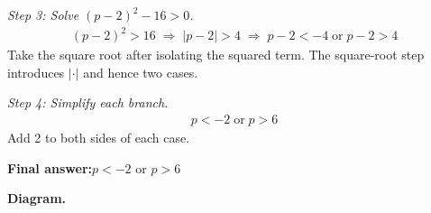 \documentclass[11pt]{article}
\begin{document}
\textit{Step 3: Solve \( (p - 2)^2 - 16 > 0 \).}
\[\begin{gathered}
(p - 2)^2 > 16 \;\Longrightarrow\; |p - 2| > 4 \;\Longrightarrow\; p - 2 < -4 \;\text{or}\; p - 2 > 4
\end{gathered}\]
Take the square root after isolating the squared term. The square-root step introduces \( | \cdot | \) and hence two cases.

\textit{Step 4: Simplify each branch.}
\[\begin{gathered}
p < -2 \;\text{or}\; p > 6
\end{gathered}\]
Add 2 to both sides of each case.

\begin{answerbox}
\textbf{Final answer:}\quad \(\displaystyle p < -2\) or \(\displaystyle p > 6\)
\end{answerbox}
\textbf{Diagram.}
\end{document}
